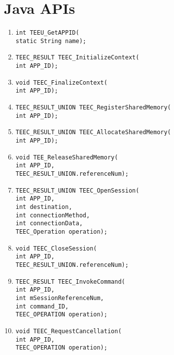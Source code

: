 \documentclass{cseminar}
\begin{document}
\section{Java APIs}
\begin{enumerate}

	\item \texttt{int TEEU\_GetAPPID(\\static String name);}

	\item \texttt{TEEC\_RESULT TEEC\_InitializeContext(\\int APP\_ID);}

	\item \texttt{void TEEC\_FinalizeContext(\\int APP\_ID);}

	\item \texttt{TEEC\_RESULT\_UNION TEEC\_RegisterSharedMemory(\\int APP\_ID);}

	\item \texttt{TEEC\_RESULT\_UNION TEEC\_AllocateSharedMemory(\\int APP\_ID);}

	\item \texttt{void TEE\_ReleaseSharedMemory(\\int APP\_ID,\\ TEEC\_RESULT\_UNION.referenceNum);}

	\item \texttt{TEEC\_RESULT\_UNION TEEC\_OpenSession(\\int APP\_ID,\\ int destination,\\ int connectionMethod,\\ int connectionData,\\ TEEC\_Operation operation);}

	\item \texttt{void TEEC\_CloseSession(\\int APP\_ID,\\ TEEC\_RESULT\_UNION.referenceNum);}

	\item \texttt{TEEC\_RESULT TEEC\_InvokeCommand(\\int APP\_ID,\\ int mSessionReferenceNum,\\ int command\_ID,\\ TEEC\_OPERATION operation);}

	\item \texttt{void TEEC\_RequestCancellation(\\int APP\_ID,\\ TEEC\_OPERATION operation);}


\end{enumerate}
\end{document}
